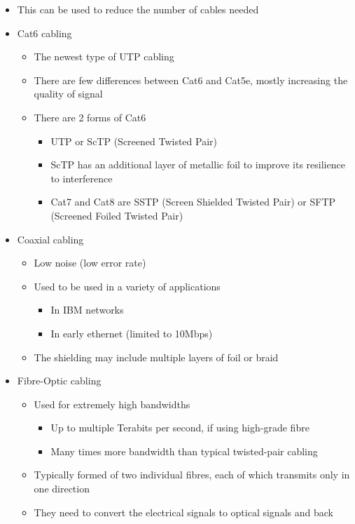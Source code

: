 \begin{itemize}
  \item This can be used to reduce the number of cables needed
  \item Cat6 cabling
  \begin{itemize}
    \item The newest type of UTP cabling
    \item There are few differences between Cat6 and Cat5e, mostly increasing the quality of signal
    \item There are 2 forms of Cat6
    \begin{itemize}
      \item UTP or ScTP (Screened Twisted Pair)
      \item ScTP has an additional layer of metallic foil to improve its resilience to interference
      \item Cat7 and Cat8 are SSTP (Screen Shielded Twisted Pair) or SFTP (Screened Foiled Twisted Pair)
    \end{itemize}
  \end{itemize}
  \item Coaxial cabling
  \begin{itemize}
    \item Low noise (low error rate)
    \item Used to be used in a variety of applications
    \begin{itemize}
      \item In IBM networks
      \item In early ethernet (limited to 10Mbps)
    \end{itemize}
    \item The shielding may include multiple layers of foil or braid
  \end{itemize}
  \item Fibre-Optic cabling
  \begin{itemize}
    \item Used for extremely high bandwidths
    \begin{itemize}
      \item Up to multiple Terabits per second, if using high-grade fibre
      \item Many times more bandwidth than typical twisted-pair cabling
    \end{itemize}
    \item Typically formed of two individual fibres, each of which transmits only in one direction
    \item They need to convert the electrical signals to optical signals and back

\end{itemize}
\end{itemize}
